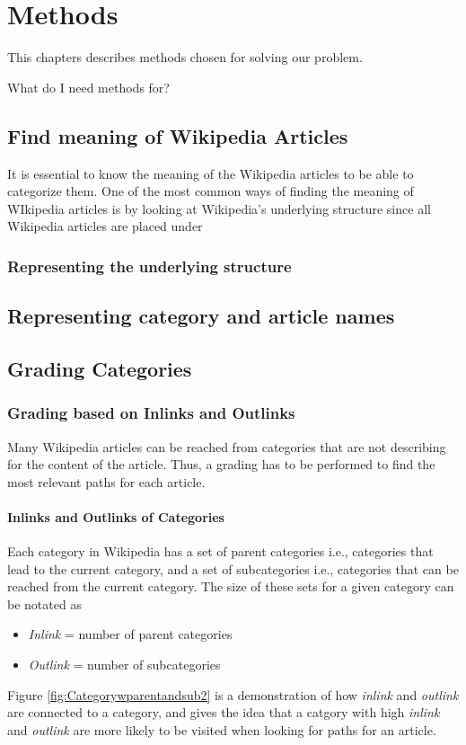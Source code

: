 \chapter{Methods}
This chapters describes methods chosen for solving our problem.

What do I need methods for?

\section{Find meaning of Wikipedia Articles}
It is essential to know the meaning of the Wikipedia articles to be able to categorize them. One of the most common ways of finding the meaning of WIkipedia articles is by looking at Wikipedia's underlying structure since all Wikipedia articles are placed under 


\subsection{Representing the underlying structure}

\section{Representing category and article names}

\section{Grading Categories}

\subsection{Grading based on Inlinks and Outlinks}
Many Wikipedia articles can be reached from categories that are not describing for the content of the article. Thus, a grading has to be performed to find the most relevant paths for each article. 

\subsubsection{Inlinks and Outlinks of Categories}
Each category in Wikipedia has a set of parent categories i.e., categories that lead to the current category, and a set of subcategories i.e., categories that can be reached from the current category. The size of these sets for a given category can be notated as 
\begin{itemize}
\item \emph{Inlink} = number of parent categories
\item \emph{Outlink} = number of subcategories
\end{itemize}
Figure \ref{fig:Categorywparentandsub2} is a demonstration of how  \emph{inlink} and \emph{outlink} are connected to a category, and gives the idea that a catgory with high \emph{inlink} and \emph{outlink} are more likely to be visited when looking for paths for an article. 

